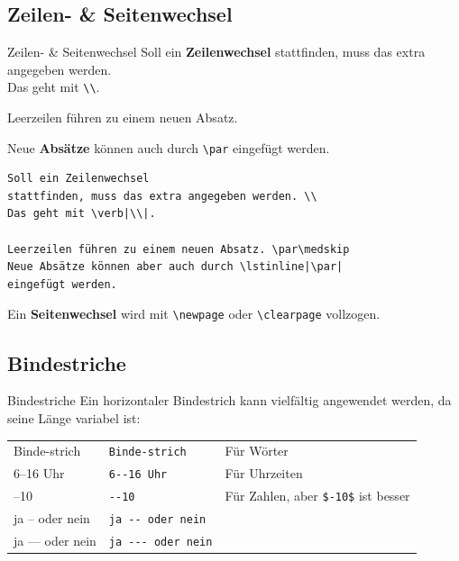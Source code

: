 \documentclass[xcolor=dvipsnames]{beamer}
\begin{document}
\subsection{Zeilen- \& Seitenwechsel}
\begin{frame}[fragile]{Zeilen- \& Seitenwechsel}
Soll ein \textbf{Zeilenwechsel} stattfinden, muss das extra angegeben werden. \\
Das geht mit \verb|\\|. \par\medskip
Leerzeilen führen zu einem neuen Absatz. \par\medskip
Neue \textbf{Absätze} können auch durch \lstinline|\par| eingefügt werden. \par\medskip
\begin{lstlisting}
Soll ein Zeilenwechsel
stattfinden, muss das extra angegeben werden. \\
Das geht mit \verb|\\|.

Leerzeilen führen zu einem neuen Absatz. \par\medskip
Neue Absätze können aber auch durch \lstinline|\par| 
eingefügt werden.
\end{lstlisting}
Ein \textbf{Seitenwechsel} wird mit \lstinline|\newpage| oder \lstinline|\clearpage| vollzogen.
\end{frame}


\subsection{Bindestriche}
\begin{frame}[fragile]{Bindestriche}
Ein horizontaler Bindestrich kann vielfältig angewendet werden, da seine Länge variabel ist: \par\medskip
{\footnotesize
\begin{tabular}{|l|l|l|}
\hline
Binde-strich & \verb|Binde-strich| & Für Wörter \\
6--16 Uhr & \verb|6--16 Uhr| & Für Uhrzeiten \\
--10 & \verb|--10| & Für Zahlen, aber \verb|$-10$| ist besser \\
ja -- oder nein & \verb|ja -- oder nein| & \\
ja --- oder nein & \verb|ja --- oder nein| & \\ \hline
\end{tabular}
}
\end{frame}
\end{document}
